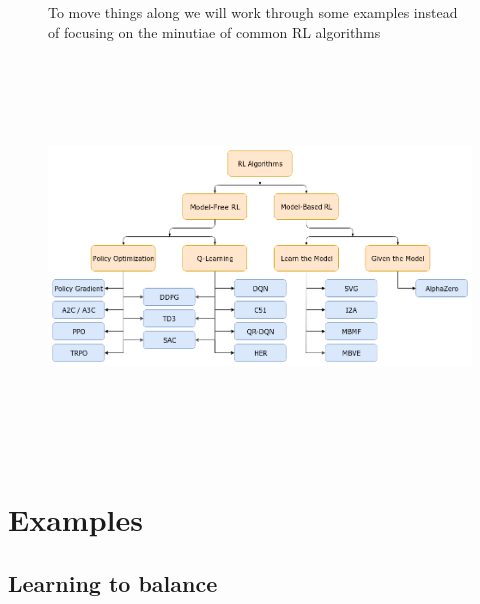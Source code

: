 \documentclass[
  letterpaper,
  DIV=11,
  numbers=noendperiod,
  oneside]{scrartcl}
\begin{document}
\begin{figure}

\begin{minipage}{\linewidth}
To move things along we will work through some examples instead of
focusing on the minutiae of common RL algorithms\end{minipage}%
\newline
\begin{minipage}{\linewidth}
\begin{center}
\includegraphics[width=\textwidth,height=4.16667in]{figs/rl_algs.png}
\end{center}
\end{minipage}%

\end{figure}%


\section{Examples}\label{examples}

\subsection{Learning to balance}\label{learning-to-balance}
\end{document}
